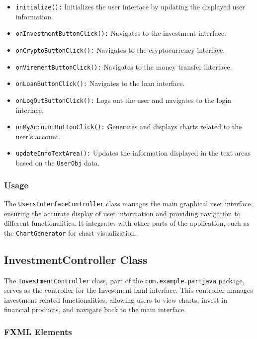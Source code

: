\documentclass{article}
\begin{document}
\begin{itemize}
    \item \texttt{initialize():} Initializes the user interface by updating the displayed user information.
    \item \texttt{onInvestmentButtonClick():} Navigates to the investment interface.
    \item \texttt{onCryptoButtonClick():} Navigates to the cryptocurrency interface.
    \item \texttt{onVirementButtonClick():} Navigates to the money transfer interface.
    \item \texttt{onLoanButtonClick():} Navigates to the loan interface.
    \item \texttt{onLogOutButtonClick():} Logs out the user and navigates to the login interface.
    \item \texttt{onMyAccountButtonClick():} Generates and displays charts related to the user's account.
    \item \texttt{updateInfoTextArea():} Updates the information displayed in the text areas based on the \texttt{UserObj} data.
\end{itemize}

\subsubsection{Usage}

The \texttt{UsersInterfaceController} class manages the main graphical user interface, ensuring the accurate display of user information and providing navigation to different functionalities. It integrates with other parts of the application, such as the \texttt{ChartGenerator} for chart visualization.

\subsection{InvestmentController Class}

The \texttt{InvestmentController} class, part of the \texttt{com.example.partjava} package, serves as the controller for the Investment.fxml interface. This controller manages investment-related functionalities, allowing users to view charts, invest in financial products, and navigate back to the main interface.

\subsubsection{FXML Elements}
\end{document}
